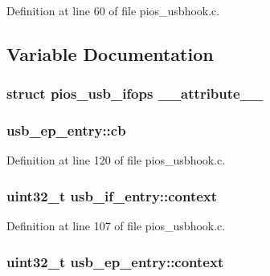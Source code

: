 \-Definition at line 60 of file pios\-\_\-usbhook.\-c.



\subsection{\-Variable \-Documentation}
\hypertarget{group___p_i_o_s___u_s_b_h_o_o_k_gaefc540229d1ad4829fb317812135c7b4}{
\subsubsection[{\-\_\-\-\_\-attribute\-\_\-\-\_\-}]{\setlength{\rightskip}{0pt plus 5cm}struct {\bf pios\-\_\-usb\-\_\-ifops}  {\bf \-\_\-\-\_\-attribute\-\_\-\-\_\-}}}\label{group___p_i_o_s___u_s_b_h_o_o_k_gaefc540229d1ad4829fb317812135c7b4}
\hypertarget{group___p_i_o_s___u_s_b_h_o_o_k_gaf0106468de445de05247315a6001789c}{
\subsubsection[{cb}]{ {\bf usb\-\_\-ep\-\_\-entry\-::cb}}}\label{group___p_i_o_s___u_s_b_h_o_o_k_gaf0106468de445de05247315a6001789c}


\-Definition at line 120 of file pios\-\_\-usbhook.\-c.

\hypertarget{group___p_i_o_s___u_s_b_h_o_o_k_gad9a6d740530f937ee0fd2870b5c02ce8}{
\subsubsection[{context}]{\setlength{\rightskip}{0pt plus 5cm}uint32\-\_\-t {\bf usb\-\_\-if\-\_\-entry\-::context}}}\label{group___p_i_o_s___u_s_b_h_o_o_k_gad9a6d740530f937ee0fd2870b5c02ce8}


\-Definition at line 107 of file pios\-\_\-usbhook.\-c.

\hypertarget{group___p_i_o_s___u_s_b_h_o_o_k_ga044e4671681d96fdf1918abb9e52542e}{
\subsubsection[{context}]{\setlength{\rightskip}{0pt plus 5cm}uint32\-\_\-t {\bf usb\-\_\-ep\-\_\-entry\-::context}}}\label{group___p_i_o_s___u_s_b_h_o_o_k_ga044e4671681d96fdf1918abb9e52542e}


